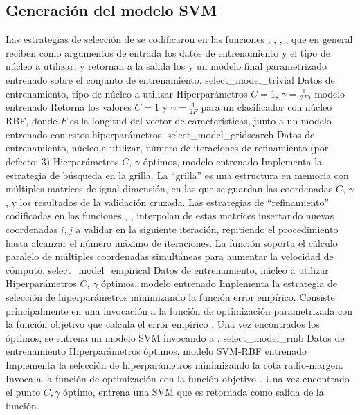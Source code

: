 %
%
\subsection{Generación del modelo SVM}
%
Las estrategias de selección de  se codificaron en las
funciones ,
, ,
, que en general reciben como argumentos de
entrada los datos de entrenamiento y el tipo de núcleo a utilizar, y
retornan a la salida los  y un modelo final parametrizado
entrenado sobre el conjunto de entrenamiento.
%
\funcentry
    {select\_model\_trivial}
    {Datos de entrenamiento, tipo de núcleo a utilizar}
    {Hiperparámetros $C=1$, $\gamma=\frac{1}{2F}$, modelo entrenado}
    {Retorna los valores $C=1$ y $\gamma=\frac{1}{2F}$
      para un clasificador con núcleo RBF, donde $F$ es la longitud
      del vector de características, junto a un modelo entrenado con
      estos hiperparámetros.}
%
\funcentry
    {select\_model\_gridsearch}
    {Datos de entrenamiento, núcleo a utilizar, número de iteraciones de
      refinamiento (por defecto: 3)}
    {Hierparámetros $C$, $\gamma$ óptimos, modelo entrenado}
    {Implementa la estrategia de búsqueda en la grilla.
      La ``grilla'' es una estructura en memoria con múltiples
      matrices de igual dimensión, en las que se guardan las
      coordenadas $C$, $\gamma$, y los resultados de la validación
      cruzada.
      Las estrategias de ``refinamiento'' codificadas en las funciones
      , , 
      interpolan de estas matrices insertando nuevas coordenadas $i,j$
      a validar en la siguiente iteración, repitiendo el procedimiento
      hasta alcanzar el número máximo de iteraciones.
      La función soporta el cálculo paralelo de múltiples coordenadas
      simultáneas para aumentar la velocidad de cómputo.}
%
%
\funcentry
    {select\_model\_empirical}
    {Datos de entrenamiento, núcleo a utilizar}
    {Hiperparámetros $C$, $\gamma$ óptimos, modelo entrenado}
    {Implementa la estrategia de selección de hiperparámetros
      minimizando la función error empírico.
      Consiste principalmente en una invocación a la función de
      optimización  parametrizada con la función
      objetivo que calcula el error empírico
      .
      Una vez encontrados los  óptimos, se entrena un modelo
      SVM invocando a .}
%
\funcentry
    {select\_model\_rmb}
    {Datos de entrenamiento}
    {Hiperparámetros óptimos, modelo SVM-RBF entrenado}
    {Implementa la selección de hiperparámetros minimizando la cota
      radio-margen.
      Invoca a la función de optimización  con la
      función objetivo .
      Una vez encontrado el punto $C,\gamma$ óptimo, entrena una SVM
      que es retornada como salida de la función.}
%
